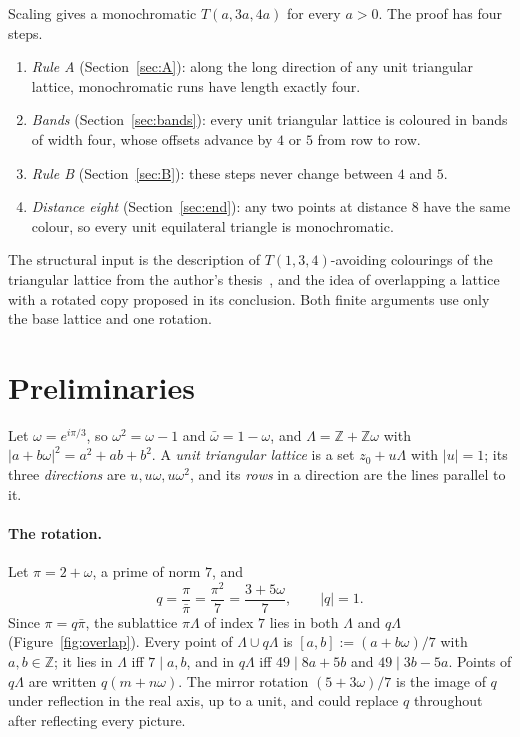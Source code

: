\documentclass[11pt]{amsart}
\theoremstyle{definition}\newtheorem{definition}[theorem]{Definition}
\theoremstyle{remark}\newtheorem{remark}[theorem]{Remark}
\begin{document}
Scaling gives a monochromatic $T(a,3a,4a)$ for every $a>0$. The proof has four steps.
\begin{enumerate}
\item \emph{Rule A} (Section~\ref{sec:A}): along the long direction of any unit triangular lattice, monochromatic runs
have length exactly four.
\item \emph{Bands} (Section~\ref{sec:bands}): every unit triangular lattice is coloured in bands of width four, whose
offsets advance by $4$ or $5$ from row to row.
\item \emph{Rule B} (Section~\ref{sec:B}): these steps never change between $4$ and $5$.
\item \emph{Distance eight} (Section~\ref{sec:end}): any two points at distance $8$ have the same colour, so every unit
equilateral triangle is monochromatic.
\end{enumerate}
The structural input is the description of $T(1,3,4)$-avoiding colourings of the triangular lattice from the
author's thesis~\cite{Yan}, and the idea of overlapping a lattice with a rotated copy proposed in its conclusion.
Both finite arguments use only the base lattice and one rotation.

\section{Preliminaries}
Let $\omega=e^{i\pi/3}$, so $\omega^2=\omega-1$ and $\bar\omega=1-\omega$, and $\Lambda=\mathbb Z+\mathbb Z\omega$ with
$|a+b\omega|^2=a^2+ab+b^2$. A \emph{unit triangular lattice} is a set $z_0+u\Lambda$ with $|u|=1$; its three
\emph{directions} are $u,u\omega,u\omega^2$, and its \emph{rows} in a direction are the lines parallel to it.

\paragraph{The rotation.} Let $\pi=2+\omega$, a prime of norm $7$, and
\[
q=\frac{\pi}{\bar\pi}=\frac{\pi^2}{7}=\frac{3+5\omega}{7},\qquad |q|=1 .
\]
Since $\pi=q\bar\pi$, the sublattice $\pi\Lambda$ of index $7$ lies in both $\Lambda$ and $q\Lambda$
(Figure~\ref{fig:overlap}). Every point of $\Lambda\cup q\Lambda$ is $[a,b]:=(a+b\omega)/7$ with $a,b\in\mathbb Z$; it lies
in $\Lambda$ iff $7\mid a,b$, and in $q\Lambda$ iff $49\mid 8a+5b$ and $49\mid 3b-5a$. Points of $q\Lambda$ are written
$q(m+n\omega)$. The mirror rotation $(5+3\omega)/7$ is the image of $q$ under reflection in the real axis, up to a
unit, and could replace $q$ throughout after reflecting every picture.
\end{document}
